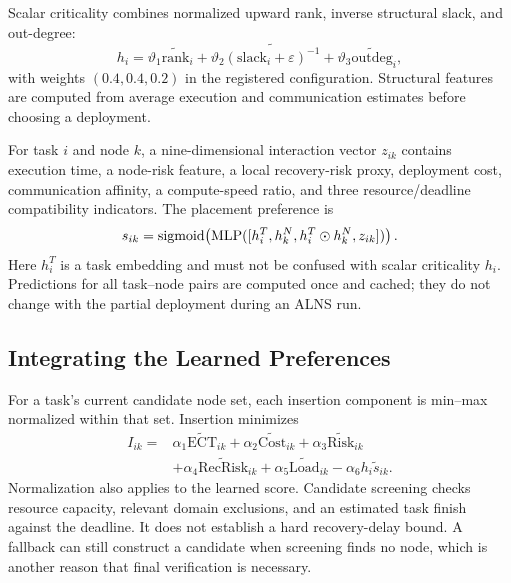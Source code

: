 Scalar criticality combines normalized upward rank, inverse structural slack,
and out-degree:
\begin{equation}
 h_i=\vartheta_1\widetilde{\mathrm{rank}}_i+
 \vartheta_2\widetilde{(\mathrm{slack}_i+\varepsilon)^{-1}}+
 \vartheta_3\widetilde{\mathrm{outdeg}}_i,
\end{equation}
with weights $(0.4,0.4,0.2)$ in the registered configuration. Structural
features are computed from average execution and communication estimates
before choosing a deployment.

For task $i$ and node $k$, a nine-dimensional interaction vector $z_{ik}$
contains execution time, a node-risk feature, a local recovery-risk proxy,
deployment cost, communication affinity, a compute-speed ratio, and three
resource/deadline compatibility indicators. The placement preference is
\begin{equation}
 s_{ik}=\operatorname{sigmoid}\!\left(
 \operatorname{MLP}([h_i^{T},h_k^{N},h_i^{T}\odot h_k^{N},z_{ik}])\right).
 \label{eq:placement_score}
\end{equation}
Here $h_i^{T}$ is a task embedding and must not be confused with scalar
criticality $h_i$. Predictions for all task--node
pairs are computed once and cached; they do not change with the partial
deployment during an ALNS run.

\subsection{Integrating the Learned Preferences}
For a task's current candidate node set, each insertion component is
min--max normalized within that set. Insertion minimizes
\begin{equation}
\begin{split}
 I_{ik}={}&\alpha_1\widetilde{\mathrm{ECT}}_{ik}
 +\alpha_2\widetilde{\mathrm{Cost}}_{ik}
 +\alpha_3\widetilde{\mathrm{Risk}}_{ik}\\
 &+\alpha_4\widetilde{\mathrm{RecRisk}}_{ik}
 +\alpha_5\widetilde{\mathrm{Load}}_{ik}
 -\alpha_6 h_i\widetilde s_{ik}.
\end{split}
\label{eq:insertion}
\end{equation}
Normalization also applies to the learned score. Candidate screening checks
resource capacity, relevant domain exclusions, and an estimated task finish
against the deadline. It does not establish a hard recovery-delay bound. A
fallback can still construct a candidate when screening finds no node, which
is another reason that final verification is necessary.

